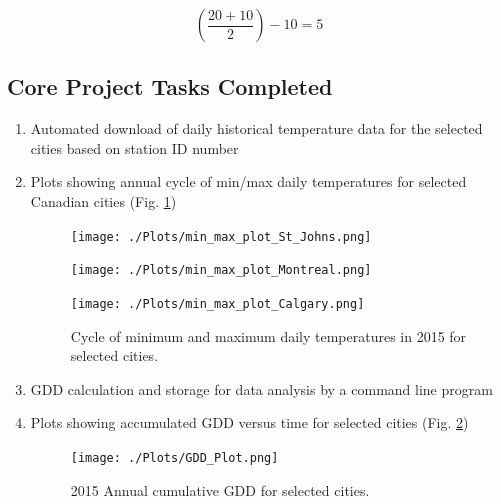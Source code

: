 \documentclass{article}
\begin{document}
\[ \left(\frac {20+10}{2}\right)-10=5 \] \par


\subsection{ \bf Core Project Tasks Completed}

\begin{enumerate}
\item  Automated download of daily historical temperature data for the selected cities based on station ID number
\item  Plots showing annual cycle of min/max daily temperatures for selected Canadian cities (Fig. \ref{gdd_min-max})
\begin{center}
\begin{figure}[!htb]
\texttt{[image: ./Plots/min\_max\_plot\_St\_Johns.png]}

\texttt{[image: ./Plots/min\_max\_plot\_Montreal.png]}

\texttt{[image: ./Plots/min\_max\_plot\_Calgary.png]}

\caption{Cycle of minimum and maximum daily temperatures in 2015 for selected cities.}
\label{gdd_min-max}
\end{figure}
\end{center}

\item  GDD calculation and storage for data analysis by a command line program
\item  Plots showing accumulated GDD versus time for selected cities (Fig. \ref{gdd_ann-cycle})
\begin{center}
\begin{figure}[!htb]
\texttt{[image: ./Plots/GDD\_Plot.png]}
\caption{2015 Annual cumulative GDD for selected cities.}
\label{gdd_ann-cycle}
\end{figure}
\end{center}

\end{enumerate}
\end{document}
